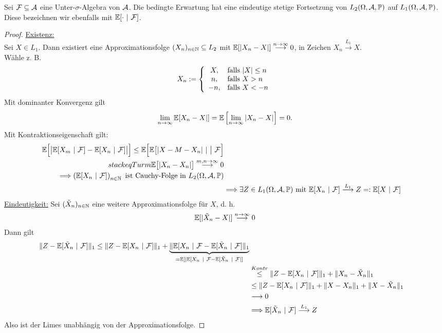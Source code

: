 \begin{proposition} %
Sei $\mathcal{F}\subseteq\mathcal{A}$ eine Unter-$\sigma$-Algebra von $\mathcal{A}$. Die bedingte Erwartung hat eine eindeutige stetige Fortsetzung von $L_2(\Omega,\mathcal{A},\mathbb{P})$ auf $L_1(\Omega,\mathcal{A},\mathbb{P})$. Diese bezeichnen wir ebenfalls mit $\mathbb{E}[\cdot~|~\mathcal{F}]$.
\end{proposition}
\begin{proof}
\underline{Existenz:}\\
Sei $X\in L_1$. Dann existiert eine Approximationsfolge $(X_n)_{n\in\mathbb{N}}\subseteq L_2$ mit $\mathbb{E}[|X_n-X|]\stackrel{n\to\infty}{\longrightarrow}0$, in Zeichen $X_n\stackrel{L_1}{\longrightarrow} X$.\\
Wähle z. B.
\begin{align*}
X_n:=\left\lbrace\begin{array}{cl}
X, & \text{falls } |X|\leq n\\
n, & \text{falls } X>n\\
-n, & \text{falls } X<-n
\end{array}\right.
\end{align*}
Mit dominanter Konvergenz gilt 
\begin{align*}
\lim\limits_{n\to\infty}\mathbb{E}[X_n-X|]=\mathbb{E}\left[\lim\limits_{n\to\infty}|X_n-X|\right]=0.
\end{align*}
Mit Kontraktionseigenschaft gilt:
\begin{align*}
\mathbb{E}\Big[\big|\mathbb{E}[X_m~|~\mathcal{F}]-\mathbb{E}[X_n~|~\mathcal{F}]\big|\Big]
\leq\mathbb{E}\Big[\mathbb{E}\big[|X-M-X_n|~|~\big|~\mathcal{F}\Big]\\
stackeq{Turm}\mathbb{E}\big[|X_n-X_n|\big]\stackrel{m,n\to\infty}{\longrightarrow}0\\
\Longrightarrow\left(\mathbb{E}[X_n~|~\mathcal{F}]\right)_{n\in\mathbb{N}}\text{ ist Cauchy-Folge in }L_2(\Omega,\mathcal{A},\mathbb{P})\\
&\Longrightarrow\exists Z\in L_1(\Omega,\mathcal{A},\mathbb{P})\text{ mit }\mathbb{E}[X_n~|~\mathcal{F}]\stackrel{L_1}{\longrightarrow} Z=:\mathbb{E}[X~|~\mathcal{F}]
\end{align*}
\underline{Eindeutigkeit:} Sei $(\tilde{X}_n)_{n\in\mathbb{N}}$ eine weitere Approximationsfolge für $X$, d. h. 
\begin{align*}
\mathbb{E}[|\tilde{X}_n-X|]
\stackrel{n\to\infty}{\longrightarrow}
0
\end{align*}
Dann gilt
\begin{align*}
\Vert Z-\mathbb{E}[\tilde{X}_n~|~\mathcal{F}]\Vert_1
\leq
\Vert Z-\mathbb{E}[X_n~|~\mathcal{F}]\Vert_1+\underbrace{\Vert\mathbb{E}[X_n~|~\mathcal{F}-\mathbb{E}[\tilde{X}_n~|~\mathcal{F}]\Vert_1}_{=\mathbb{E}[|\mathbb{E}[X_n~|~\mathcal{F}-\mathbb{E}[\tilde{X}_n~|~\mathcal{F}|]}\\
&\stackrel{Kontr}{\leq}
\Vert Z-\mathbb{E}[X_n~|~\mathcal{F}]\Vert_1+\Vert X_n-\tilde{X}_n\Vert_1\\
&\leq\Vert Z-\mathbb{E}[X_n~|~\mathcal{F}]\Vert_1+\Vert X-X_n\Vert_1+\Vert X-\tilde{X}_n\Vert_1\\
&\longrightarrow0\\
&\Longrightarrow\mathbb{E}[\tilde{X}_n~|~\mathcal{F}]\stackrel{L_1}{\longrightarrow} Z
\end{align*}
Also ist der Limes unabhängig von der Approximationsfolge.
\end{proof}

